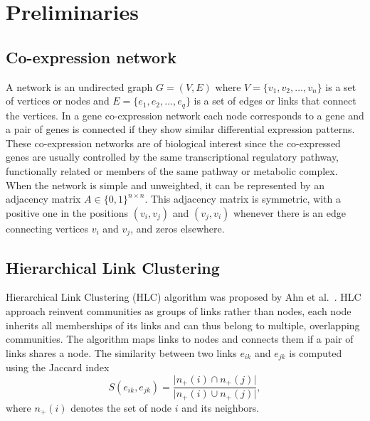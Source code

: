 \documentclass[12pt,journal, onecolumn]{IEEEtran}
\begin{document}
\section{Preliminaries}

\subsection{Co-expression network}
A network is an undirected graph $G=(V,E)$ where ${V=\{v_1,v_2,\ldots,v_{n}\}}$ is a set of vertices or nodes and ${E=\{e_1,e_2,\ldots,e_q\}}$ is a set of edges or links that connect the vertices. In a gene co-expression network each node corresponds to a gene and a pair of genes is connected if they show similar differential expression patterns. These co-expression networks are of biological interest since the co-expressed genes are usually controlled by the same transcriptional regulatory pathway, functionally related or members of the same pathway or metabolic complex.\\

When the network is simple and unweighted, it can be represented by an adjacency matrix $A \in \{0,1\}^{n \times n}$. This adjacency matrix is symmetric, with a positive one in the positions $(v_i,v_j)$ and $(v_j,v_i)$ whenever there is an edge connecting vertices $v_i$ and $v_j$, and zeros elsewhere.\\

\subsection{Hierarchical Link Clustering}

Hierarchical Link Clustering (HLC) algorithm was proposed by Ahn et al.~\cite{ahn2010link}. HLC approach reinvent communities as groups of links rather than nodes, each node inherits all memberships of its links and can thus belong to multiple, overlapping communities. The algorithm maps links to nodes and connects them if a pair of links shares a node. The similarity between two links $e_{ik}$ and $e_{jk}$ is computed using the Jaccard index 
\begin{equation*}
\label{eq:jaccard}
S(e_{ik},e_{jk}) = \frac{\vert n_+(i) \cap n_+(j) \vert}{\vert n_+(i) \cup n_+(j) \vert},
\end{equation*}
where $n_+(i)$ denotes the set of node $i$ and its neighbors.\\
\end{document}
